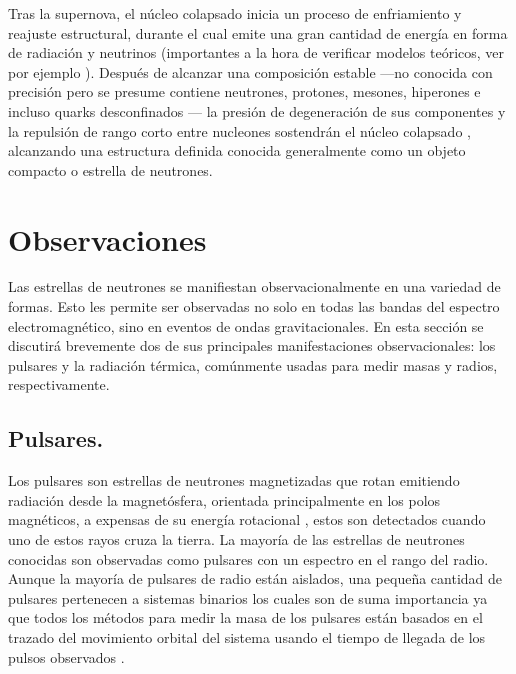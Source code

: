 Tras la supernova, el núcleo colapsado   inicia un proceso de enfriamiento y reajuste estructural, durante el cual emite una gran cantidad de energía en forma de radiación y neutrinos (importantes a la hora de verificar modelos teóricos, ver por ejemplo \cite{Alvarez-Salazar2018}). Después de alcanzar una composición estable —no conocida con precisión pero se presume contiene neutrones, protones, mesones, hiperones e incluso quarks desconfinados \cite{Lattimer2004}— la presión de degeneración de sus componentes y la repulsión de rango corto entre nucleones sostendrán el núcleo colapsado \cite{Glendenning2000}, alcanzando una estructura definida conocida generalmente como un objeto compacto o estrella de neutrones.
\section{Observaciones}\label{ObsMan}
\noindent Las estrellas de neutrones se manifiestan observacionalmente en una variedad de formas. Esto les permite ser observadas no solo en todas las bandas del espectro electromagnético, sino en eventos de ondas gravitacionales. En esta sección se discutirá brevemente dos de sus principales manifestaciones observacionales: los pulsares y la radiación térmica, comúnmente usadas para medir masas y radios, respectivamente.

\subsection{Pulsares.}

\noindent Los pulsares son estrellas de neutrones magnetizadas que rotan emitiendo radiación desde la magnetósfera, orientada principalmente en los polos magnéticos, a expensas de su energía rotacional \cite{Becker2009}, estos son detectados cuando uno de estos rayos cruza la tierra. La mayoría de las estrellas de neutrones conocidas son observadas como pulsares con un espectro en el rango del radio. Aunque la mayoría de pulsares de radio están aislados, una pequeña cantidad de pulsares pertenecen a sistemas binarios los cuales son de suma importancia ya que todos los métodos para medir la masa de los pulsares están basados en el trazado del movimiento orbital del sistema usando el tiempo de llegada de los pulsos observados \cite{Ozel2016}.


